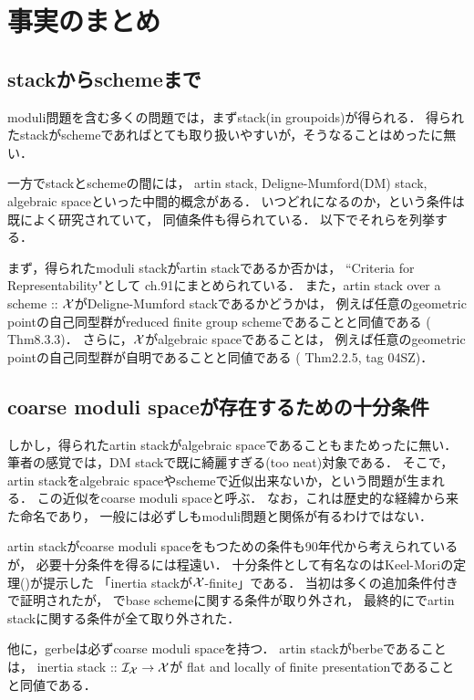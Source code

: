 \documentclass[a4paper, dvipdfmx]{jsarticle}
\begin{document}
\section{事実のまとめ}
    \subsection{stackからschemeまで}
    moduli問題を含む多くの問題では，まずstack(in groupoids)が得られる．
    得られたstackがschemeであればとても取り扱いやすいが，そうなることはめったに無い．
    
    一方でstackとschemeの間には，
    artin stack, Deligne-Mumford(DM) stack, algebraic spaceといった中間的概念がある．
    いつどれになるのか，という条件は既によく研究されていて，
    同値条件も得られている．
    以下でそれらを列挙する．

    まず，得られたmoduli stackがartin stackであるか否かは，
    ``Criteria for Representability"として\cite{SP} ch.91にまとめられている．
    また，artin stack over a scheme :: $\mathcal{X}$がDeligne-Mumford stackであるかどうかは，
    例えば任意のgeometric pointの自己同型群がreduced finite group schemeであることと同値である
    (\cite{ASS} Thm8.3.3)．
    さらに，$\mathcal{X}$がalgebraic spaceであることは，
    例えば任意のgeometric pointの自己同型群が自明であることと同値である
    (\cite{Con07} Thm2.2.5, \cite{SP} tag 04SZ)．

    \subsection{coarse moduli spaceが存在するための十分条件}
    しかし，得られたartin stackがalgebraic spaceであることもまためったに無い．
    筆者の感覚では，DM stackで既に綺麗すぎる(too neat)対象である．
    そこで，artin stackをalgebraic spaceやschemeで近似出来ないか，という問題が生まれる．
    この近似をcoarse moduli spaceと呼ぶ．
    なお，これは歴史的な経緯から来た命名であり，
    一般には必ずしもmoduli問題と関係が有るわけではない．

    artin stackがcoarse moduli spaceをもつための条件も90年代から考えられているが，
    必要十分条件を得るには程遠い．
    十分条件として有名なのはKeel-Moriの定理(\cite{KM97})が提示した
    「inertia stackが$\mathcal{X}$-finite」である．
    当初は多くの追加条件付きで証明されたが，
    \cite{Con05}でbase schemeに関する条件が取り外され，
    最終的に\cite{Rydh13}でartin stackに関する条件が全て取り外された．
    
    他に，gerbeは必ずcoarse moduli spaceを持つ．
    artin stackがberbeであることは，
    inertia stack :: $\mathcal{I}_{\mathcal{X}} \to \mathcal{X}$が
    flat and locally of finite presentationであることと同値である．
\end{document}
